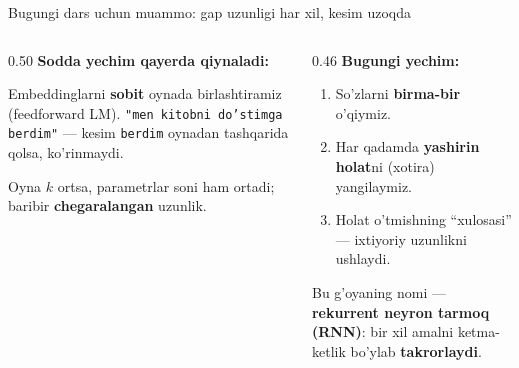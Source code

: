 \documentclass[aspectratio=169,11pt]{beamer}
\begin{document}
\begin{frame}{Bugungi dars uchun muammo: gap uzunligi har xil, kesim uzoqda}
  \begin{columns}[T]
    \begin{column}{0.50\textwidth}
      \textbf{Sodda yechim qayerda qiynaladi:}\\[3pt]
      \small
      \begin{tcolorbox}[warnbox,title={Sobit oyna ko'r},top=2pt,bottom=2pt]
        \footnotesize
        Embeddinglarni \textbf{sobit} oynada birlashtiramiz (feedforward LM).
        \texttt{"men kitobni do'stimga berdim"} --- kesim \texttt{berdim} oynadan
        tashqarida qolsa, ko'rinmaydi.
      \end{tcolorbox}
      \vspace{3pt}
      \begin{tcolorbox}[warnbox,title={Oynani kattalashtirish qimmat},top=2pt,bottom=2pt]
        \footnotesize
        Oyna $k$ ortsa, parametrlar soni ham ortadi; baribir \textbf{chegaralangan}
        uzunlik.
      \end{tcolorbox}
    \end{column}
    \begin{column}{0.46\textwidth}
      \textbf{Bugungi yechim:}\\[4pt]
      \small
      \begin{enumerate}\setlength\itemsep{4pt}
        \item So'zlarni \textbf{birma-bir} o'qiymiz.
        \item Har qadamda \textbf{yashirin holat}ni (xotira) yangilaymiz.
        \item Holat o'tmishning ``xulosasi'' --- ixtiyoriy uzunlikni ushlaydi.
      \end{enumerate}
      \vspace{5pt}
      \begin{tcolorbox}[okbox,top=2pt,bottom=2pt]
        \footnotesize
        Bu g'oyaning nomi --- \textbf{rekurrent neyron tarmoq (RNN)}: bir xil
        amalni ketma-ketlik bo'ylab \textbf{takrorlaydi}.
      \end{tcolorbox}
    \end{column}
  \end{columns}
\end{frame}

\end{document}
